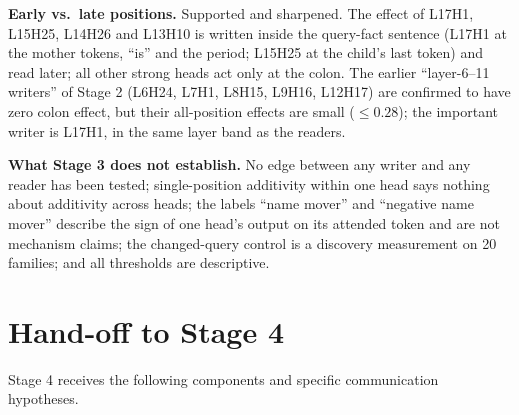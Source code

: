 \documentclass[11pt,a4paper]{article}
\begin{document}
\textbf{Early vs.\ late positions.} Supported and sharpened. The effect of L17H1,
L15H25, L14H26 and L13H10 is written inside the query-fact sentence (L17H1 at the
mother tokens, ``is'' and the period; L15H25 at the child's last token) and read
later; all other strong heads act only at the colon. The earlier ``layer-6--11
writers'' of Stage 2 (L6H24, L7H1, L8H15, L9H16, L12H17) are confirmed to have zero
colon effect, but their all-position effects are small ($\le0.28$); the important
writer is L17H1, in the same layer band as the readers.

\textbf{What Stage 3 does not establish.} No edge between any writer and any reader has
been tested; single-position additivity within one head says nothing about additivity
across heads; the labels ``name mover'' and ``negative name mover'' describe the sign of
one head's output on its attended token and are not mechanism claims; the changed-query
control is a discovery measurement on 20 families; and all thresholds are descriptive.

\section{Hand-off to Stage 4}
\label{sec:stage4}
Stage 4 receives the following components and specific communication hypotheses.
\end{document}
